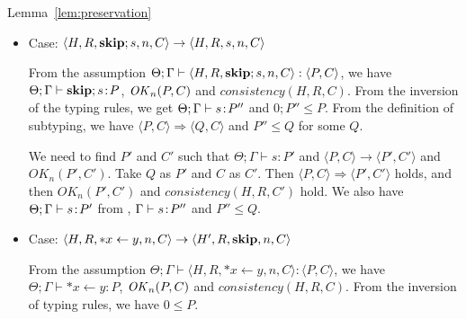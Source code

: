 \begin{pfof}{Lemma~\ref{lem:preservation}}
\begin{itemize}
  We need to find \(P'\) and \(C'\) such that \(\Theta;\Gamma, x'
  \vdash [x'/x]s\COL P'\), \( \langle P, C \rangle
  \xLongrightarrow{\Malloc} \langle P', C' \rangle\),
  \(consistency(H', R', C')\) and \(OK_{n-1}(P', C')\). Take \(Q\) as
  \(P'\) and \(C\) as \(C'\).  Then \( \langle P, C \rangle
  \xLongrightarrow{\Malloc} \langle P', C' \rangle\) holds, and
  then \(OK_{n-1}(P', C')\) and \(consistency(H', R', C')\) hold by
  Lemma~\ref{lem:okPreserved} and Lemma~\ref{lem:consistency}. From
  \(\Theta; \Gamma, x \vdash s : P''\) and \( \Malloc;(x)P'' \le P\),
  we have \(\Theta; \Gamma, x'' \vdash [x''/x]s : [x''/x]P''\) and \(
  \Malloc;(x)P'' \le P\), and then by the definition of subtyping we
  have \([x''/x]P'' \le Q'\) for some \(Q'\). Therefore, we get
  \(\Theta; \Gamma, x'' \vdash [x''/x]s : Q'\). Take \(x''\) as \(x'\)
  and \(Q'\) as \(P'\), then \(\Theta;\Gamma, x' \vdash [x'/x]s\COL
  P'\) holds.
      
\item Case: \( \langle H, R, \mathbf{skip};s, n, C \rangle \rightarrow \langle
  H, R, s, n, C \rangle \)

  From the assumption \( \Theta; \Gamma \vdash \langle H, R, \mathbf{skip};s,
  n, C \rangle : \langle P, C \rangle\), we have \(\Theta;\Gamma
  \vdash \mathbf{skip};s\!:\! P\), \(\mathit{OK}_{n}(P, C)\) and \(consistency(H, R,
  C)\). From the inversion of the typing rules, we get \(\Theta;
  \Gamma \vdash s\!:\! P''\) and \(0;P'' \le P\). From the definition
  of subtyping, we have \( \langle P, C \rangle \Longrightarrow
  \langle Q, C \rangle\) and \(P'' \le Q\) for some \(Q\).

  We need to find \(P'\) and \(C'\) such that \(\Theta; \Gamma \vdash
  s : P'\) and \(\langle P, C \rangle \rightarrow \langle P', C'
  \rangle\) and \(OK_n(P', C')\). Take \(Q\) as \(P'\) and \(C\) as
  \(C'\). Then \(\langle P, C\rangle \Longrightarrow \langle P', C'
  \rangle\) holds, and then \(OK_n(P', C')\) and \(consistency(H, R,
  C')\) hold. We also have \(\Theta;\Gamma \vdash s\!:\! P'\) from
  , \(\Gamma \vdash s\!:\! P''\) and \(P'' \le Q\).

\item Case: \( \langle H, R, *x \leftarrow y , n, C\rangle \rightarrow
  \langle H', R, \mathbf{skip}, n, C\rangle \)

  From the assumption \( \Theta; \Gamma \vdash \langle H, R, *x
  \leftarrow y, n, C \rangle : \langle P, C \rangle\), we have
  \(\Theta; \Gamma \vdash *x \leftarrow y : P\), \(\mathit{OK}_{n}(P, C)\) and
  \(consistency(H, R, C)\). From the inversion of typing rules, we
  have \(0 \le P\).


\end{itemize}
\end{pfof}
